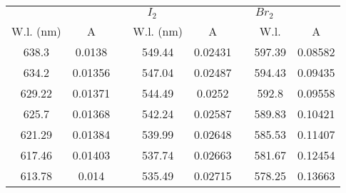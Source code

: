 \documentclass[letterpaper,12pt]{article}
\begin{document}
\begin{table}[!h]
\centering
\begin{tabular}{cccccccc}
\rowcolor[HTML]{C0C0C0} 
\multicolumn{2}{c}{\cellcolor[HTML]{C0C0C0}$I_2$} & \cellcolor[HTML]{EFEFEF} & \multicolumn{2}{c}{\cellcolor[HTML]{C0C0C0}$I_2$} & \cellcolor[HTML]{EFEFEF} & \multicolumn{2}{c}{\cellcolor[HTML]{C0C0C0}$Br_2$} \\
\rowcolor[HTML]{C0C0C0} 
W.l. (nm)                & A                      & \cellcolor[HTML]{EFEFEF} & W.l. (nm)                & A                      & \cellcolor[HTML]{EFEFEF} & W.l.                    & A                        \\
\rowcolor[HTML]{EFEFEF} 
638.3                    & 0.0138                 &                          & 549.44                   & 0.02431                &                          & 597.39                  & 0.08582                  \\
\rowcolor[HTML]{EFEFEF} 
634.2                    & 0.01356                &                          & 547.04                   & 0.02487                &                          & 594.43                  & 0.09435                  \\
\rowcolor[HTML]{EFEFEF} 
629.22                   & 0.01371                &                          & 544.49                   & 0.0252                 &                          & 592.8                   & 0.09558                  \\
\rowcolor[HTML]{EFEFEF} 
625.7                    & 0.01368                &                          & 542.24                   & 0.02587                &                          & 589.83                  & 0.10421                  \\
\rowcolor[HTML]{EFEFEF} 
621.29                   & 0.01384                &                          & 539.99                   & 0.02648                &                          & 585.53                  & 0.11407                  \\
\rowcolor[HTML]{EFEFEF} 
617.46                   & 0.01403                &                          & 537.74                   & 0.02663                &                          & 581.67                  & 0.12454                  \\
\rowcolor[HTML]{EFEFEF} 
613.78                   & 0.014                  &                          & 535.49                   & 0.02715                &                          & 578.25                  & 0.13663                  \\

\end{tabular}
\end{table}
\end{document}
